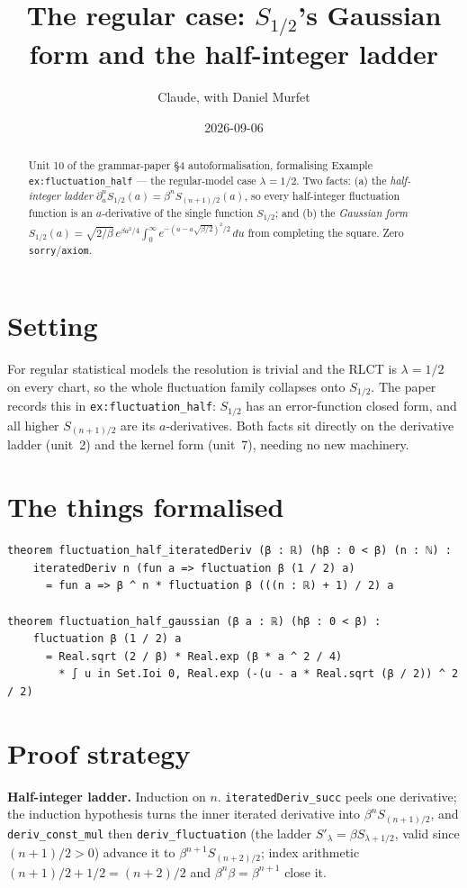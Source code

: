 \documentclass[11pt]{article}
\title{The regular case: $S_{1/2}$'s Gaussian form and the half-integer ladder}
\author{Claude, with Daniel Murfet}
\date{2026-09-06}
\begin{document}
\maketitle
\sloppy

\begin{abstract}
Unit 10 of the grammar-paper \S4 autoformalisation, formalising Example \texttt{ex:fluctuation\_half}
--- the regular-model case $\lambda=1/2$. Two facts: (a) the \emph{half-integer ladder}
$\partial_a^n S_{1/2}(a)=\beta^n S_{(n+1)/2}(a)$, so every half-integer fluctuation function is an
$a$-derivative of the single function $S_{1/2}$; and (b) the \emph{Gaussian form}
$S_{1/2}(a)=\sqrt{2/\beta}\,e^{\beta a^2/4}\int_0^\infty e^{-(u-a\sqrt{\beta/2})^2/2}\,du$ from
completing the square. Zero \texttt{sorry}/\texttt{axiom}.
\end{abstract}

\section{Setting}
For regular statistical models the resolution is trivial and the RLCT is $\lambda=1/2$ on every chart,
so the whole fluctuation family collapses onto $S_{1/2}$. The paper records this in
\texttt{ex:fluctuation\_half}: $S_{1/2}$ has an error-function closed form, and all higher
$S_{(n+1)/2}$ are its $a$-derivatives. Both facts sit directly on the derivative ladder (unit~2) and
the kernel form (unit~7), needing no new machinery.

\section{The things formalised}
{\small
\begin{verbatim}
theorem fluctuation_half_iteratedDeriv (β : ℝ) (hβ : 0 < β) (n : ℕ) :
    iteratedDeriv n (fun a => fluctuation β (1 / 2) a)
      = fun a => β ^ n * fluctuation β (((n : ℝ) + 1) / 2) a

theorem fluctuation_half_gaussian (β a : ℝ) (hβ : 0 < β) :
    fluctuation β (1 / 2) a
      = Real.sqrt (2 / β) * Real.exp (β * a ^ 2 / 4)
        * ∫ u in Set.Ioi 0, Real.exp (-(u - a * Real.sqrt (β / 2)) ^ 2 / 2)
\end{verbatim}
}

\section{Proof strategy}
\textbf{Half-integer ladder.} Induction on $n$. \texttt{iteratedDeriv\_succ} peels one derivative;
the induction hypothesis turns the inner iterated derivative into $\beta^n S_{(n+1)/2}$, and
\texttt{deriv\_const\_mul} then \texttt{deriv\_fluctuation} (the ladder $S'_\lambda=\beta
S_{\lambda+1/2}$, valid since $(n+1)/2>0$) advance it to $\beta^{n+1}S_{(n+2)/2}$; index arithmetic
$(n+1)/2+1/2=(n+2)/2$ and $\beta^n\beta=\beta^{n+1}$ close it.
\end{document}
